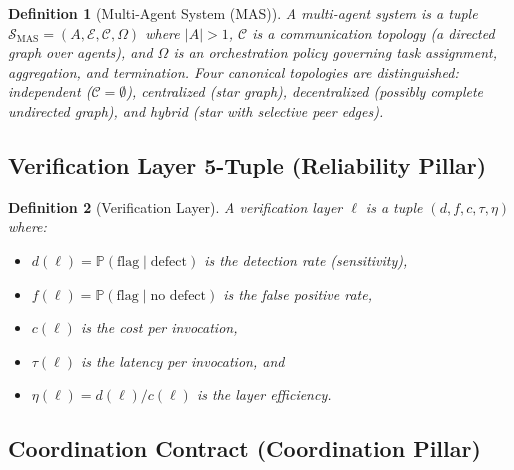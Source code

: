 \documentclass[11pt, a4paper]{googledeepmind}
\newcommand{\Prob}{\mathbb{P}}
\newtheorem{definition}{Definition}[section]
\begin{document}
\begin{appendices}
\begin{definition}[Multi-Agent System (MAS)]
\label{def:ext-mas}
A \emph{multi-agent system} is a tuple
$\mathcal{S}_{\text{MAS}} = (A, \mathcal{E}, \mathcal{C}, \Omega)$
where $|A| > 1$, $\mathcal{C}$ is a communication topology
(a directed graph over agents), and $\Omega$ is an orchestration policy
governing task assignment, aggregation, and termination.
Four canonical topologies are distinguished:
\emph{independent} ($\mathcal{C} = \emptyset$),
\emph{centralized} (star graph),
\emph{decentralized} (possibly complete undirected graph), and
\emph{hybrid} (star with selective peer edges).
\end{definition}


\subsection{Verification Layer 5-Tuple (Reliability Pillar)}

\begin{definition}[Verification Layer]
\label{def:ext-vlayer}
A \emph{verification layer} $\ell$ is a tuple $(d, f, c, \tau, \eta)$ where:
\begin{itemize}[nosep]
  \item $d(\ell) = \Prob(\text{flag} \mid \text{defect})$ is the detection rate (sensitivity),
  \item $f(\ell) = \Prob(\text{flag} \mid \text{no defect})$ is the false positive rate,
  \item $c(\ell)$ is the cost per invocation,
  \item $\tau(\ell)$ is the latency per invocation, and
  \item $\eta(\ell) = d(\ell) / c(\ell)$ is the layer efficiency.
\end{itemize}
\end{definition}


\subsection{Coordination Contract (Coordination Pillar)}


\end{appendices}
\end{document}
